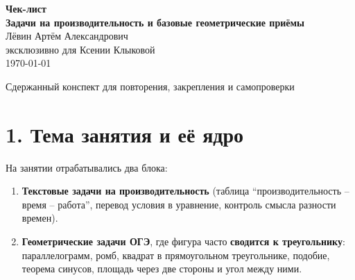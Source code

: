 \documentclass[a4paper,12pt]{article}
\newcommand{\topic}{Задачи на производительность и базовые геометрические приёмы}
\newcommand{\studentname}{Ксении Клыковой}
\begin{document}
\begin{titlepage}
\thispagestyle{empty}
\begin{center}
\vspace*{2.2cm}

{\Huge\bfseries \textcolor{darkaccent}{Чек-лист}}\\[0.6cm]
{\LARGE\bfseries \textcolor{textgray}{\topic}}\\[1.5cm]

{\Large Лёвин Артём Александрович\\[0.2cm]
эксклюзивно для \studentname}\\[1.2cm]

{\large \today}

\vfill


\vspace{0.4cm}
{\small\textcolor{textgray}{Сдержанный конспект для повторения, закрепления и самопроверки}}
\end{center}
\end{titlepage}

\section*{1. Тема занятия и её ядро}

На занятии отрабатывались два блока:

\begin{enumerate}
    \item \textbf{Текстовые задачи на производительность}  
    (таблица ``производительность -- время -- работа'', перевод условия в уравнение, контроль смысла разности времен).
    \item \textbf{Геометрические задачи ОГЭ}, где фигура часто \textbf{сводится к треугольнику}:  
    параллелограмм, ромб, квадрат в прямоугольном треугольнике, подобие, теорема синусов, площадь через две стороны и угол между ними.
\end{enumerate}
\end{document}
